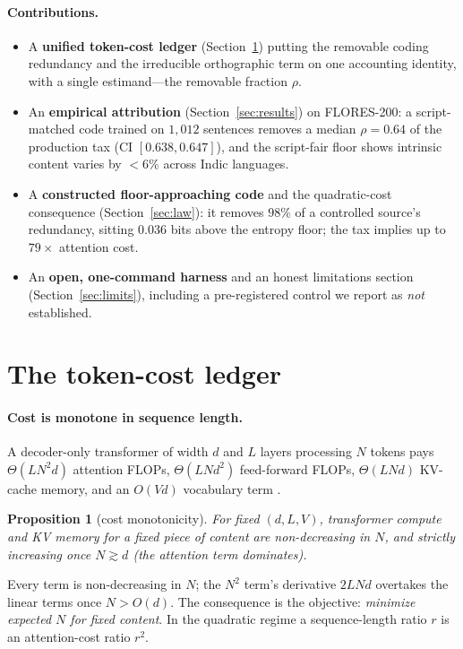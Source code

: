 \documentclass[11pt]{article}
\newtheorem{proposition}{Proposition}
\begin{document}
\paragraph{Contributions.}
\begin{itemize}[leftmargin=1.2em,itemsep=1pt]
\item A \textbf{unified token-cost ledger} (Section~\ref{sec:model}) putting the removable coding
redundancy and the irreducible orthographic term on one accounting identity, with a single estimand---the
removable fraction $\rho$.
\item An \textbf{empirical attribution} (Section~\ref{sec:results}) on FLORES-200: a script-matched code
trained on $1{,}012$ sentences removes a median $\rho=0.64$ of the production tax (CI $[0.638,0.647]$),
and the script-fair floor shows intrinsic content varies by $<6\%$ across Indic languages.
\item A \textbf{constructed floor-approaching code} and the quadratic-cost consequence
(Section~\ref{sec:law}): it removes $98\%$ of a controlled source's redundancy, sitting $0.036$ bits
above the entropy floor; the tax implies up to $79\times$ attention cost.
\item An \textbf{open, one-command harness} and an honest limitations section
(Section~\ref{sec:limits}), including a pre-registered control we report as \emph{not} established.
\end{itemize}

\section{The token-cost ledger}\label{sec:model}
\paragraph{Cost is monotone in sequence length.} A decoder-only transformer of width $d$ and $L$ layers
processing $N$ tokens pays $\Theta(L N^2 d)$ attention FLOPs, $\Theta(L N d^2)$ feed-forward FLOPs,
$\Theta(L N d)$ KV-cache memory, and an $O(Vd)$ vocabulary term \citep{vaswani2017attention}.

\begin{proposition}[cost monotonicity]\label{prop:mono}
For fixed $(d,L,V)$, transformer compute and KV memory for a fixed piece of content are non-decreasing
in $N$, and strictly increasing once $N\gtrsim d$ (the attention term dominates).
\end{proposition}
\noindent Every term is non-decreasing in $N$; the $N^2$ term's derivative $2LNd$ overtakes the linear
terms once $N>O(d)$. The consequence is the objective: \emph{minimize expected $N$ for fixed content}.
In the quadratic regime a sequence-length ratio $r$ is an attention-cost ratio $r^2$.
\end{document}
